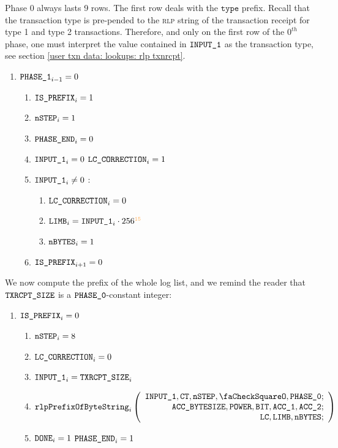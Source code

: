 \begin{center}
\end{center}

Phase 0 always lasts 9 rows.
The first row deals with the $\texttt{type}$ prefix. Recall that the transaction type is pre-pended to the \textsc{rlp} string of the transaction receipt for type 1 and type 2 transactions.
Therefore, and only on the first row of the $0^{th}$ phase, one must interpret the value contained in $\texttt{INPUT\_1}$ as the transaction type, see section \ref{user txn data: lookups: rlp txnrcpt}.
\begin{enumerate}
	\item \If $\texttt{PHASE\_1}_{i-1}=0$ \Then
		\begin{enumerate}
			\item $\texttt{IS\_PREFIX}_{i}=1$
			\item $\texttt{nSTEP}_{i}=1$
			\item $\texttt{PHASE\_END}_{i}=0$
			\item \If $\texttt{INPUT\_1}_{i}=0$ \Then $\texttt{LC\_CORRECTION}_{i}=1$
			\item \If $\texttt{INPUT\_1}_{i} \neq 0$ \Then:
				\begin{enumerate}
					\item $\texttt{LC\_CORRECTION}_{i}=0$
					\item $\limb_{i}=\Input{1}_{i}\cdot256^{\llargeMO}$ 
					\item $\texttt{nBYTES}_{i}=1$
				\end{enumerate}
			\item $\texttt{IS\_PREFIX}_{i+1}=0$ 
		\end{enumerate}
\end{enumerate}
We now compute the \rlp{} prefix of the whole log list, and we remind the reader that $\texttt{TXRCPT\_SIZE}$ is a $\texttt{PHASE\_0}$-constant integer:
\begin{enumerate}[resume]
	\item \If $\texttt{IS\_PREFIX}_{i}=0$ \Then
		\begin{enumerate}
			\item $\texttt{nSTEP}_{i}=8$
			\item $\texttt{LC\_CORRECTION}_{i}=0$
			\item $\texttt{INPUT\_1}_{i} = \texttt{TXRCPT\_SIZE}_{i}$
			\item 
				\[
					\rlpPrefixByteString_{i}
					\left(
					\begin{array}{r}
						\Input1,
						\ct,
						\nbstep,
						\done,
						\phase{0}; \\
						\accsize,
						\col{POWER},
						\col{BIT},
						\acc1,
						\acc2; \\
						\lc,
						\limb,
						\limbsize; \\
					\end{array}
					\right)
				\]
			\item \If $\texttt{DONE}_{i}=1$ \Then $\texttt{PHASE\_END}_{i}=1$
		\end{enumerate}
\end{enumerate}
